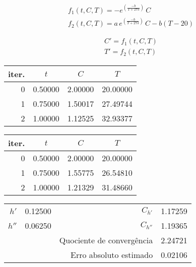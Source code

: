 \setcounter{chapter}{15}

\begin{center}
\begin{minipage}[c]{0.5\textwidth}
\begin{gather*}
	f_1(t,C,T) = -e^{\left(\frac{-b}{T+273}\right)}\,C\\
	f_2(t,C,T) = a\,e^{\left(\frac{-b}{T+273}\right)}\,C -b(T-20)
\end{gather*}
\end{minipage}%
\begin{minipage}[c]{0.5\textwidth}
\begin{gather*}
	C' = f_1(t,C,T)\\
	T' = f_2(t,C,T)
\end{gather*}
\end{minipage}
\end{center}
%
\begin{center}
\begin{minipage}[c]{0.5\textwidth}
\begin{center}\begin{tabular}{r | c c c}
	iter. & $t$ & $C$ & $T$ \\ \hline
	0     & 0.50000 & 2.00000 & 20.00000 \\
	1     & 0.75000 & 1.50017 & 27.49744 \\
	2     & 1.00000 & 1.12525 & 32.93377
\end{tabular} \end{center}
\end{minipage}%
\begin{minipage}[c]{0.5\textwidth}
\begin{center}\begin{tabular}{r | c c c}
	iter. & $t$ & $C$ & $T$ \\ \hline
	0     & 0.50000 & 2.00000 & 20.00000 \\
	1     & 0.75000 & 1.55775 & 26.54810 \\
	2     & 1.00000 & 1.21329 & 31.48660
\end{tabular} \end{center}
\end{minipage}
\end{center}
\begin{center} \begin{tabular}{ r | c || r | c}
	$h' $ & 0.12500 & $C_{h'} $ & 1.17259 \\
	$h''$ & 0.06250 & $C_{h''}$ & 1.19365 \\
	      &         & Quociente de convergência & 2.24721 \\
	      &         & Erro absoluto estimado & 0.02106
\end{tabular} \end{center}
